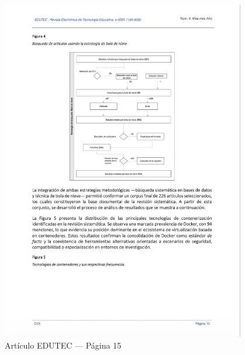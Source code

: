 \begin{figure}[H]
    \centering
    \begin{tcolorbox}[
        colback=white,
        colframe=gray!50,
        boxrule=1pt,
        arc=2pt,
        boxsep=5pt,
        left=3pt,
        right=3pt,
        top=3pt,
        bottom=3pt,
        drop shadow
    ]
        \includegraphics[width=0.95\textwidth,keepaspectratio]{apendices/EDUTEC/15.png}
    \end{tcolorbox}
    \caption{Artículo EDUTEC --- Página 15}\label{fig:edutec-pagina-15}
\end{figure}
\FloatBarrier

